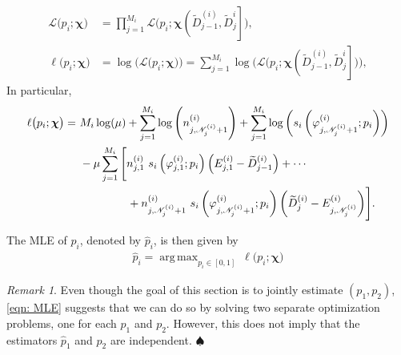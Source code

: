 \documentclass[11pt]{article}
\newcommand{\jp}[1]{\footnote{J-P: #1}}
\theoremstyle{remark}
\newtheorem{remark}[thm]{Remark}
\theoremstyle{definition}
\DeclareMathOperator*{\argmax}{arg\,max}
\newcommand{\bs}[1]{{\boldsymbol #1 }}
\numberwithin{equation}{section}
\begin{document}
\begin{align}
    \mathcal{L}\big(p_i; \bs\chi\big) &= \prod_{j=1}^{M_i} \mathcal{L}\Big(p_i; \bs\chi\left(\widetilde{D}^{(i)}_{j-1}, \widetilde{D}^{i}_j\right]\Big), \; \label{eqn:likelihood}
    \\
    \ell\big(p_i; \bs\chi\big) &= \log\Big( \mathcal{L}\big(p_i; \bs\chi\big) \Big)
    = \sum_{j=1}^{M_i} \log \bigg(\mathcal{L}\Big(p_i; \bs\chi\left(\widetilde{D}^{(i)}_{j-1}, \widetilde{D}^{i}_j\right]\Big)\bigg), \label{eqn:log likelihood}
\end{align}
In particular,
\begin{align}\label{eqn:log_likelihood:formula}
    \ell\big(p_i; \bs\chi\big) = \ &M_i \log(\mu)
    + \sum_{j=1}^{M_i} \log\Bigg(n^{(i)}_{j, {\mathscr N}^{(i)}_{j}+1}\Bigg)
    + \sum_{j=1}^{M_i} \log\left(
    s_i\left(\varphi^{(i)}_{j, {\mathscr N}^{(i)}_{j}+1}; p_i\right)\right)
    \notag
    \\
    &- \mu \sum_{j=1}^{M_i} \Bigg[
    n^{(i)}_{j,1} \ s_i\left(\varphi^{(i)}_{j,1}; p_i\right)\Big(E^{(i)}_{j,1} - \widetilde{D}^{(i)}_{j-1}\Big)
    + \cdots \notag
    \\
    &\hspace{1.5cm}
    + n^{(i)}_{j, {\mathscr N}^{(i)}_{j}+1}
    \ s_i\left(\varphi^{(i)}_{j, {\mathscr N}^{(i)}_{j}+1}; p_i\right)
    \bigg(\widetilde{D}^{(i)}_{j} - E^{(i)}_{j,{\mathscr N}^{(i)}_{j}}\bigg)
    \Bigg].
\end{align}

The MLE of $p_i$, denoted by $\widehat{p}_i$, is then given by
\begin{align} \label{eqn: MLE}
    \widehat{p}_i = \argmax_{p_i \in [0,1]} \ \mathcal{\ell}\big(p_i; \bs\chi\big)
\end{align}

\begin{remark}
    Even though the goal of this section is to jointly estimate $(p_1, p_2)$, \eqref{eqn: MLE} suggests that we can do so by solving two separate optimization problems, one for each $p_1$ and $p_2$.
    However, this does not imply that the estimators $\widehat{p}_1$ and $\widehat{p}_2$ are independent. \hfill $\spadesuit$
\end{remark}
\end{document}
